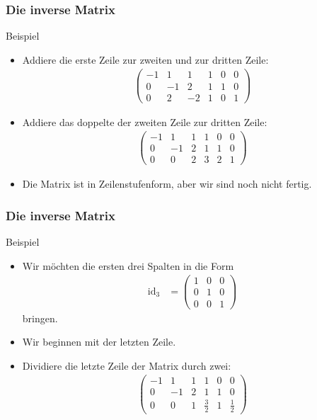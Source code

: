 \documentclass{beamer}
\newcommand{\id}{\mathrm{id}}
\renewcommand{\oe}{\"o}
\newcommand{\mytitle}{Die inverse Matrix}
\begin{document}
\begin{frame}\frametitle{\mytitle}
	\begin{block}{Beispiel}
	\begin{itemize}
		\item Addiere die erste Zeile zur zweiten und zur dritten Zeile:
\begin{align*}
				\begin{pmatrix}
					-1&1&1&1&0&0\\0&-1&2&1&1&0\\0&2&-2&1&0&1 
				\end{pmatrix}
			\end{align*}
		\item Addiere das doppelte der zweiten Zeile zur dritten Zeile:
\begin{align*}
				\begin{pmatrix}
					-1&1&1&1&0&0\\0&-1&2&1&1&0\\0&0&2&3&2&1 
				\end{pmatrix}
			\end{align*}
		\item Die Matrix ist in Zeilenstufenform, aber wir sind noch nicht fertig.
	\end{itemize}	
	\end{block}
\end{frame}

\begin{frame}\frametitle{\mytitle}
	\begin{block}{Beispiel}
	\begin{itemize}
		\item Wir m\oe chten die ersten drei Spalten in die Form
			\begin{align*}
				\id_3&=\begin{pmatrix}1&0&0\\0&1&0\\0&0&1 \end{pmatrix}
			\end{align*}
			bringen.
		\item Wir beginnen mit der letzten Zeile.
		\item Dividiere die letzte Zeile der Matrix durch zwei:
\begin{align*}
				\begin{pmatrix}
					-1&1&1&1&0&0\\0&-1&2&1&1&0\\0&0&1&\frac{3}{2}&1&\frac{1}{2} 
				\end{pmatrix}
			\end{align*}
	\end{itemize}	
	\end{block}
\end{frame}
\end{document}
